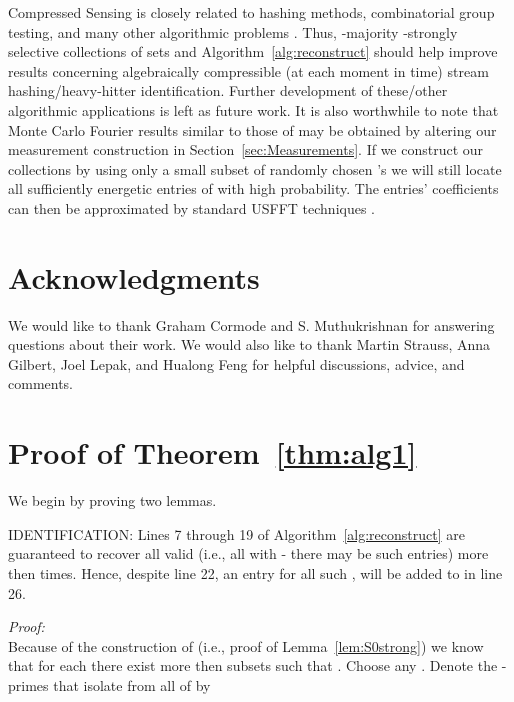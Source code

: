\documentclass{article}
\begin{document}
Compressed Sensing is closely related to hashing methods, combinatorial group testing, and many other algorithmic problems \cite{FirstDetCS,Crprecis}.  Thus, -majority -strongly selective collections of sets and Algorithm~\ref{alg:reconstruct} should help improve results concerning algebraically compressible (at each moment in time) stream hashing/heavy-hitter identification.  Further development of these/other algorithmic applications is left as future work.  It is also worthwhile to note that Monte Carlo Fourier results similar to those of \cite{AAFFT2} may be obtained by altering our measurement construction in Section~\ref{sec:Measurements}.  If we construct our  collections by using only a small subset of randomly chosen 's we will still locate all sufficiently energetic entries of  with high probability.  The entries' coefficients can then be approximated by standard USFFT techniques \cite{AAFFT2,USFFT1,USFFT2,AUSFFTrev}.

\section{Acknowledgments}

We would like to thank Graham Cormode and S. Muthukrishnan for answering questions about their work.  We would also like to thank Martin Strauss, Anna Gilbert, Joel Lepak, and Hualong Feng for helpful discussions, advice, and comments.




\appendix

\section{Proof of Theorem~\ref{thm:alg1}}

We begin by proving two lemmas.

\begin{Lemma}
IDENTIFICATION:  Lines 7 through 19 of Algorithm~\ref{alg:reconstruct} are guaranteed to recover all valid  (i.e., all  with  - there may be  such entries) more then  times.  Hence, despite line 22, an entry for all such , will be added to  in line 26.
\label{lem:identification}
\end{Lemma}

\noindent \textit{Proof:}\\

Because of the construction of  (i.e., proof of Lemma~\ref{lem:S0strong}) we know that for each  there exist more then  subsets  such that .  Choose any .  Denote the -primes that isolate  from all of  by
\end{document}
